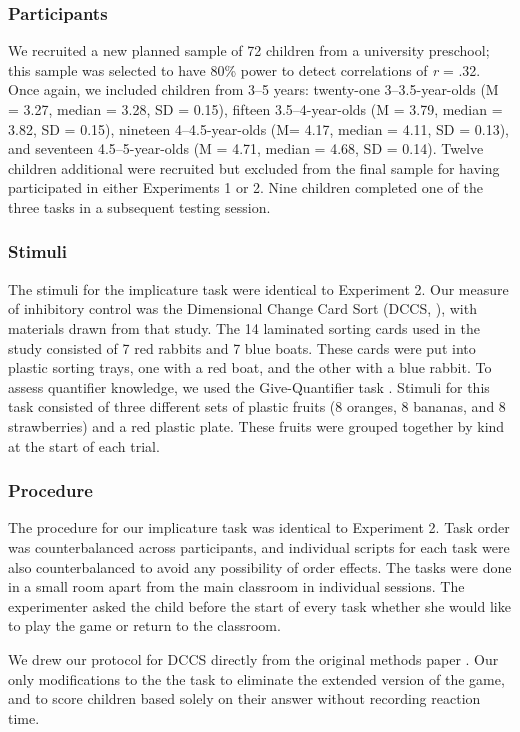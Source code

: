 \documentclass[man]{apa2}
\begin{document}
\subsubsection{Participants} We recruited a new planned sample of 72 children from a university preschool; this sample was selected to have 80\% power to detect correlations of \emph{r} = .32. Once again, we included children from 3--5 years: twenty-one 3--3.5-year-olds (M = 3.27, median = 3.28, SD = 0.15), fifteen 3.5--4-year-olds (M = 3.79, median = 3.82, SD = 0.15), nineteen 4--4.5-year-olds (M= 4.17, median = 4.11, SD = 0.13), and seventeen 4.5--5-year-olds (M = 4.71, median = 4.68, SD = 0.14). Twelve children additional were recruited but excluded from the final sample for having participated in either Experiments 1 or 2. Nine children completed one of the three tasks in a subsequent testing session. 

\subsubsection{Stimuli} The stimuli for the implicature task were identical to Experiment 2. Our measure of inhibitory control was the Dimensional Change Card Sort (DCCS, \cite{zelazo2006}), with materials drawn from that study. The 14 laminated sorting cards used in the study consisted of 7 red rabbits and 7 blue boats. These cards were put into plastic sorting trays, one with a red boat, and the other with a blue rabbit. To assess quantifier knowledge, we used the Give-Quantifier task \cite{barner2009}. Stimuli for this task consisted of three different sets of plastic fruits (8 oranges, 8 bananas, and 8 strawberries) and a red plastic plate. These fruits were grouped together by kind at the start of each trial. 

\subsubsection{Procedure}
The procedure for our implicature task was identical to Experiment 2. Task order was counterbalanced across participants, and individual scripts for each task were also counterbalanced to avoid any possibility of order effects. The tasks were done in a small room apart from the main classroom in individual sessions. The experimenter asked the child before the start of every task whether she would like to play the game or return to the classroom. 

We drew our protocol for DCCS directly from the original methods paper \cite{zelazo2006}. Our only modifications to the the task to eliminate the extended version of the game, and to score children based solely on their answer without recording reaction time.  
\end{document}
